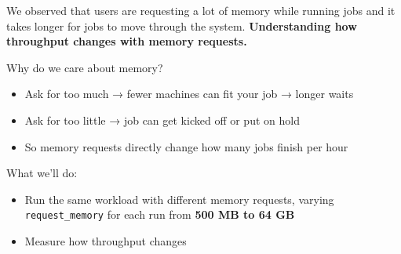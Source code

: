 \documentclass[
]{article}
\providecommand{\tightlist}{%
  \setlength{\itemsep}{0pt}\setlength{\parskip}{0pt}}
\begin{document}
We observed that users are requesting a lot of memory while running jobs
and it takes longer for jobs to move through the system.
\textbf{Understanding how throughput changes with memory requests.}

Why do we care about memory?

\begin{itemize}
\tightlist
\item
  Ask for too much → fewer machines can fit your job → longer waits
\item
  Ask for too little → job can get kicked off or put on hold
\item
  So memory requests directly change how many jobs finish per hour
\end{itemize}

What we'll do:

\begin{itemize}
\tightlist
\item
  Run the same workload with different memory requests, varying
  \texttt{request\_memory} for each run from \textbf{500 MB to 64 GB}
\item
  Measure how throughput changes
\end{itemize}
\end{document}
